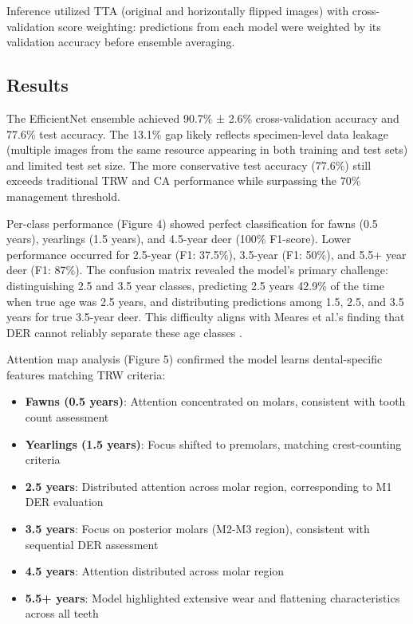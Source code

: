 \documentclass{iopjournal}
\begin{document}
Inference utilized TTA (original and horizontally flipped images) with cross-validation score weighting: predictions from each model were weighted by its validation accuracy before ensemble averaging.

\subsection{Results}

The EfficientNet ensemble achieved 90.7\% ± 2.6\% cross-validation accuracy and 77.6\% test accuracy. The 13.1\% gap likely reflects specimen-level data leakage (multiple images from the same resource appearing in both training and test sets) and limited test set size. The more conservative test accuracy (77.6\%) still exceeds traditional TRW and CA performance while surpassing the 70\% management threshold.

Per-class performance (Figure 4) showed perfect classification for fawns (0.5 years), yearlings (1.5 years), and 4.5-year deer (100\% F1-score). Lower performance occurred for 2.5-year (F1: 37.5\%), 3.5-year (F1: 50\%), and 5.5+ year deer (F1: 87\%). The confusion matrix revealed the model's primary challenge: distinguishing 2.5 and 3.5 year classes, predicting 2.5 years 42.9\% of the time when true age was 2.5 years, and distributing predictions among 1.5, 2.5, and 3.5 years for true 3.5-year deer. This difficulty aligns with Meares et al.'s finding that DER cannot reliably separate these age classes \cite{meares2006quantitative}.

Attention map analysis (Figure 5) confirmed the model learns dental-specific features matching TRW criteria:
\begin{itemize}
    \item \textbf{Fawns (0.5 years)}: Attention concentrated on molars, consistent with tooth count assessment
    \item \textbf{Yearlings (1.5 years)}: Focus shifted to premolars, matching crest-counting criteria  
    \item \textbf{2.5 years}: Distributed attention across molar region, corresponding to M1 DER evaluation
    \item \textbf{3.5 years}: Focus on posterior molars (M2-M3 region), consistent with sequential DER assessment
    \item \textbf{4.5 years}: Attention distributed across molar region
    \item \textbf{5.5+ years}: Model highlighted extensive wear and flattening characteristics across all teeth
\end{itemize}
\end{document}
